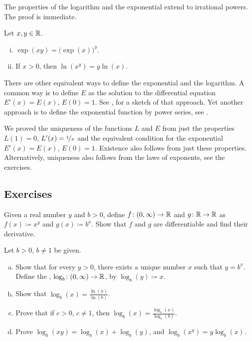 The properties of the logarithm and the exponential extend to
irrational powers.  The proof is immediate.

\begin{prop}
Let $x, y \in {\mathbb{R}}$.
\begin{enumerate}[(i)]
\item
$\exp(xy) = {\bigl(\exp(x)\bigr)}^y$.
\item
If $x > 0$, then $\ln(x^y) = y \ln (x)$.
\end{enumerate}
\end{prop}

\begin{remark}
There are other equivalent ways to define the exponential and the logarithm.
A common way is to define $E$ as the solution to the differential equation
$E'(x) = E(x)$, $E(0) = 1$.  See ,
for a sketch of that approach.  Yet another
approach is to define the exponential function by
power series, see .
\end{remark}

\begin{remark}
We proved the uniqueness of the functions $L$ and $E$ from
just the properties $L(1)=0$, $L'(x) = \nicefrac{1}{x}$
and the equivalent condition for the exponential
$E'(x) = E(x)$, $E(0) = 1$.  Existence also follows
from just these properties.
Alternatively, uniqueness also follows
from the laws of exponents, see the exercises.
\end{remark}

\subsection{Exercises}

\begin{exercise}
Given a real number $y$ and $b > 0$, define $f \colon (0,\infty) \to {\mathbb{R}}$
and $g \colon {\mathbb{R}} \to {\mathbb{R}}$ as $f(x) \coloneqq x^y$ and $g(x) \coloneqq b^x$.  Show that $f$
and $g$ are differentiable and find their derivative.
\end{exercise}

\begin{samepage}
\begin{exercise} \label{exercise:otherlogbases}
Let $b > 0$, $b\neq 1$ be given.
\begin{enumerate}[a)]
\item
Show that for every $y > 0$, there exists a unique number $x$
such that $y = b^x$.  Define
the \emph{},
$\log_b \colon (0,\infty) \to {\mathbb{R}}$, by
$\log_b(y) \coloneqq x$.
\item
Show that $\log_b(x) = \frac{\ln(x)}{\ln(b)}$.
\item
Prove that if $c > 0$, $c \neq 1$, then
$\log_b(x) = \frac{\log_c(x)}{\log_c(b)}$.
\item
Prove $\log_b(xy) =
\log_b(x)+\log_b(y)$, and $\log_b(x^y) = y \log_b(x)$.
\end{enumerate}
\end{exercise}
\end{samepage}

